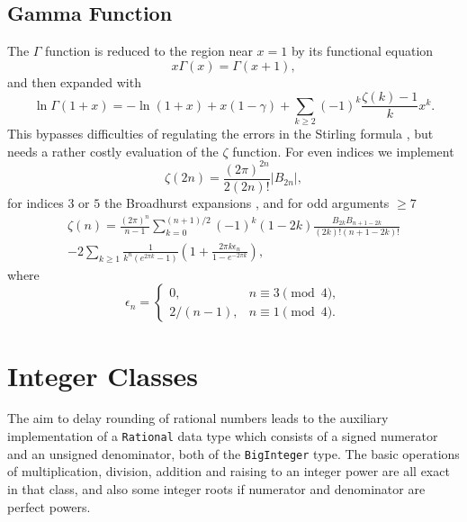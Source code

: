 \documentclass[showpacs,showkeys,amssymb,aps,twocolumn]{revtex4-1}
\begin{document}
\subsection{Gamma Function}
The $\Gamma$ function is reduced to the region near $x=1$ by its
functional equation
\begin{equation}
x\Gamma(x)=\Gamma(x+1),
\end{equation}
and then expanded with \cite[(6.1.33)]{AS}
\begin{equation}
\ln \Gamma(1+x) = -\ln(1+x)+x(1-\gamma) +\sum_{k\ge 2}(-1)^k\frac{\zeta(k)-1}{k}x^k
.
\end{equation}
This bypasses difficulties of regulating the errors in the Stirling formula
\cite{SpiraMathComp25,WrenchMCom22,GordonJACM7}, but needs a rather costly evaluation of the $\zeta$ function.
For even indices we implement \cite[(23.2.16)]{AS}
\begin{equation}
\zeta(2n)= \frac{(2\pi)^{2n}}{2(2n)!}|B_{2n}|,
\label{eq.zetaB}
\end{equation}
for indices $3$ or $5$ the Broadhurst expansions \cite{BroadhurstArxiv98},
and for odd arguments $\ge 7$ \cite{CohenExpMath1}
\begin{eqnarray}
\zeta(n) = \frac{(2\pi)^n}{n-1}
\sum_{k=0}^{(n+1)/2}
(-1)^k(1-2k)\frac{B_{2k}B_{n+1-2k}}{(2k)!(n+1-2k)!}
\nonumber \\
-2\sum_{k\ge 1}
\frac{1}{k^n(e^{2\pi k}-1)}
\left(1+\frac{2\pi k\epsilon_n}{1-e^{-2\pi k}}\right),
\end{eqnarray}
where
\begin{equation}
\epsilon_n = \left\{
\begin{array}{ll}
0, & n\equiv 3 \pmod 4,\\
2/(n-1), & n\equiv 1 \pmod 4.
\end{array}
\right.
\end{equation}

\section{Integer Classes}

The aim to delay rounding of rational numbers leads to the auxiliary
implementation of a \texttt{Rational} data type which consists of a
signed numerator and an unsigned denominator, both of the \texttt{BigInteger} type.
The basic operations of multiplication, division, addition and raising
to an integer power are all exact in that class, and also some 
integer roots if numerator and denominator are perfect powers.
\end{document}
